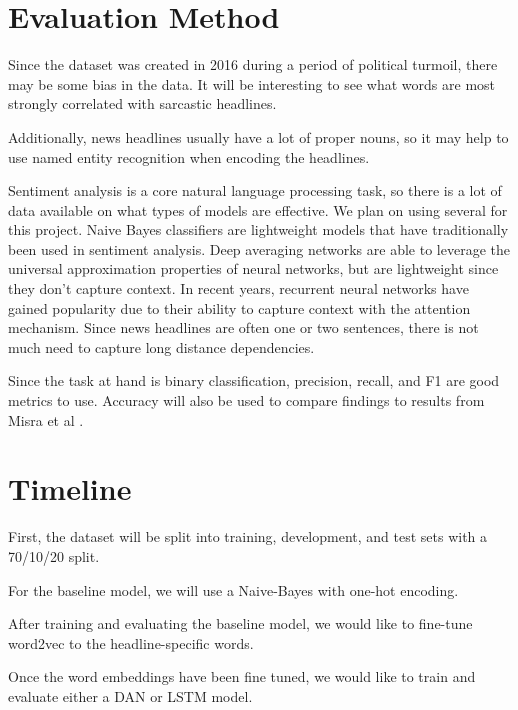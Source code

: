 \documentclass[11pt]{article}
\begin{document}
\section{Evaluation Method}

Since the dataset was created in 2016 during a period of political turmoil,
there may be some bias in the data. It will be interesting to see what words
are most strongly correlated with sarcastic headlines.

Additionally, news headlines usually have a lot of proper nouns, so it may help
to use named entity recognition when encoding the headlines.

Sentiment analysis is a core natural language processing task, so there is a
lot of data available on what types of models are effective. We plan on using
several for this project. Naive Bayes classifiers are lightweight models that
have traditionally been used in sentiment analysis. Deep averaging networks are
able to leverage the universal approximation properties of neural networks, but
are lightweight since they don't capture context. In recent years, recurrent
neural networks have gained popularity due to their ability to capture context
with the attention mechanism. Since news headlines are often one or two
sentences, there is not much need to capture long distance dependencies.

Since the task at hand is binary classification, precision, recall, and F1 are
good metrics to use. Accuracy will also be used to compare findings to results
from Misra et al \cite{misra2023Sarcasm}.

\section{Timeline}
First, the dataset will be split into training, development, and test sets with
a 70/10/20 split.

For the baseline model, we will use a Naive-Bayes with one-hot encoding.

After training and evaluating the baseline model, we would like to fine-tune
word2vec to the headline-specific words.

Once the word embeddings have been fine tuned, we would like to train and
evaluate either a DAN or LSTM model.



\end{document}
